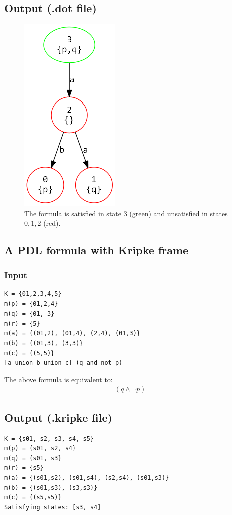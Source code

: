 \documentclass[12pt,a4paper]{article}
\begin{document}
\subsection*{Output (.dot file)}

\begin{figure}[H]
\center
\includegraphics[scale=0.4]{example1.png}

\caption{The formula is satisfied in state $3$ (green) and unsatisfied in states $0, 1, 2$ (red). }
\end{figure}


\subsection{A PDL formula with Kripke frame}

\subsubsection*{Input}
\begin{verbatim}
K = {01,2,3,4,5}
m(p) = {01,2,4}
m(q) = {01, 3}
m(r) = {5}
m(a) = {(01,2), (01,4), (2,4), (01,3)}
m(b) = {(01,3), (3,3)}
m(c) = {(5,5)}
[a union b union c] (q and not p)
\end{verbatim}
The above formula is equivalent to:
\begin{align*}
[((a \cup b) \cup c)](q \wedge \neg p)
\end{align*}
\subsection*{Output (.kripke file)}
\begin{verbatim}
K = {s01, s2, s3, s4, s5}
m(p) = {s01, s2, s4}
m(q) = {s01, s3}
m(r) = {s5}
m(a) = {(s01,s2), (s01,s4), (s2,s4), (s01,s3)}
m(b) = {(s01,s3), (s3,s3)}
m(c) = {(s5,s5)}
Satisfying states: [s3, s4]
\end{verbatim}
\end{document}
